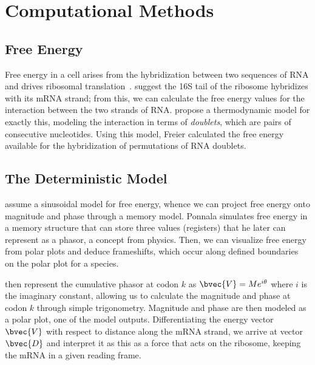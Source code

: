 \documentclass[12pt, draft]{article}
\numberwithin{equation}{section}
\begin{document}
\section{Computational Methods}
\subsection{Free Energy}
\label{freeenergy}

Free energy in a cell arises from the hybridization between two
sequences of RNA and drives ribosomal translation~\cite{starmer}.
\citet{weiss88} suggest the 16S tail of the ribosome hybridizes with its mRNA strand;
from this, we can calculate the free energy values for the interaction between the two strands of RNA.
\citet{freier} propose a thermodynamic model for exactly this,
modeling the interaction in terms of \emph{doublets}, which are pairs of consecutive nucleotides.
Using this model, Freier calculated the free energy available
for the hybridization of permutations of RNA doublets.

\subsection{The Deterministic Model}
\citet{lalit:mechanics} assume a sinusoidal model for
free energy, whence we can project free energy onto magnitude and
phase through a memory model. Ponnala simulates free
energy in a memory structure that can store three values (registers)
that he later can represent as a phasor, a concept from physics. Then,
we can visualize free energy from polar plots and deduce frameshifts,
which occur along defined boundaries~\citet{lalit:mechanics} on the polar plot for a species.
 
\citet{lalit:embs} then represent the cumulative phasor
at codon $k$ as $\bvec{V} = Me^{i\theta}$ where $i$ is the imaginary
constant, allowing us to calculate the magnitude and phase at codon
$k$ through simple trigonometry. Magnitude and phase are then modeled
as a polar plot, one of the model outputs. Differentiating the energy vector $\bvec{V}$
with respect to distance along the mRNA strand, we
arrive at vector $\bvec{D}$ and interpret  it as
this as a force that acts on the ribosome, keeping the mRNA in
a given reading frame.
 
\end{document}
